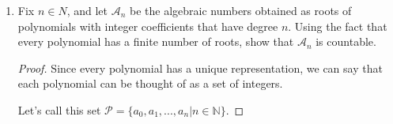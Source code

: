 \documentclass[12pt,letterpaper]{article}
\begin{document}
\begin{enumerate}
\begin{enumerate}
\begin{proof}
\begin{enumerate}
                So we have $a_0 = -2, a_2 = 1, a_1 = a_3 = a_4 = ... = a_n = 0$
                Thus, $\sqrt{2}$ is an algebraic number.

              \item
                Following similar logic.
                If we let $x = \sqrt[3]{2}$, then we can manipulate this equation.
                \begin{align*}
                  x &= \sqrt[3]{2} \\
                  x^3 &= 2 \\
                  x^3 - 2 &= 0
                \end{align*}

                So we have $a_0 = -2, a_3 = 1, a_1 = a_3 = a_4 = ... = a_n = 0$
                Thus, $\sqrt[3]{2}$ is an algebraic number.

              \item
                This is a bit more complex.
                \begin{align*}
                  x &= \sqrt{2} + \sqrt{3} \\
                  x^2 &= 2 + 3 + 2\sqrt{6} \\
                  x^2 - 5 &= 2\sqrt{6} \\
                  x^4 - 10x^2 + 25 &= 24 \\
                  x^4 - 10x^2 + 1 &= 0
                \end{align*}

                So we have $a_0 = 1, a_2 = -10, a_4 = 1, a_1 = a_3 = a_5 = a_6 = ... = a_n = 0$
                Thus, $\sqrt{2} + \sqrt{3}$ is an algebraic number.
            \end{enumerate}
          \end{proof}
        \item Fix $n \in N$,
          and let $\mathcal{A}_n$ be the algebraic numbers obtained as roots of
          polynomials with integer coefficients that have degree $n$.
          Using the fact that every polynomial has a ﬁnite number of roots,
          show that $\mathcal{A}_n$ is countable.

          \begin{proof}
            Since every polynomial has a unique representation,
            we can say that each polynomial can be thought of as a set of integers.

            Let's call this set $\mathcal{P} = \{a_0, a_1, ..., a_n | n \in \mathbb{N}\}$.


\end{proof}
\end{enumerate}
\end{enumerate}
\end{document}
